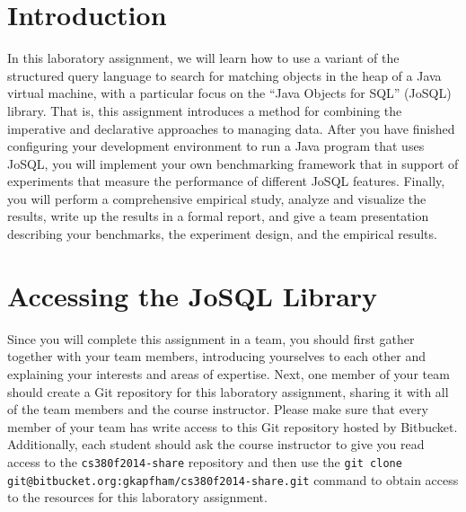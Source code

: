 


\usepackage[compact]{titlesec}



\section*{Introduction}

In this laboratory assignment, we will learn how to use a variant of the structured query language to search for
matching objects in the heap of a Java virtual machine, with a particular focus on the ``Java Objects for SQL'' (JoSQL)
library. That is, this assignment introduces a method for combining the imperative and declarative approaches to
managing data. After you have finished configuring your development environment to run a Java program that uses JoSQL,
you will implement your own benchmarking framework that in support of experiments that measure the performance of
different JoSQL features.  Finally, you will perform a comprehensive empirical study, analyze and visualize the results,
write up the results in a formal report, and give a team presentation describing your benchmarks, the experiment
design, and the empirical results.

\section*{Accessing the JoSQL Library}

Since you will complete this assignment in a team, you should first gather together with your team members, introducing
yourselves to each other and explaining your interests and areas of expertise. Next, one member of your team should
create a Git repository for this laboratory assignment, sharing it with all of the team members and the course
instructor. Please make sure that every member of your team has write access to this Git repository hosted by Bitbucket.
Additionally, each student should ask the course instructor to give you read access to the {\tt cs380f2014-share}
repository and then use the {\tt git clone git@bitbucket.org:gkapfham/cs380f2014-share.git} command to obtain access to
the resources for this laboratory assignment.

